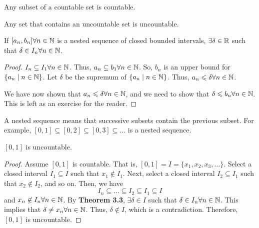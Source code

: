\begin{theorem}{}{}
    Any subset of a countable set is countable.
\end{theorem}
\begin{theorem}{}{}
    Any set that contains an uncountable set is uncountable.
\end{theorem}

\begin{theorem}{}{}
    If $[a_n, b_n] \forall n \in \mathbb{N}$ is a nested sequence of closed bounded intervals, $\exists \delta \in \mathbb{R}$ such that $\delta \in I_n \forall n \in \mathbb{N}$.
\end{theorem}
\begin{proof}
    $I_n \subseteq I_1 \forall n \in \mathbb{N}$. Thus, $a_n \subseteq b_1 \forall n \in \mathbb{N}$. So, $b_n$ is an upper bound for $\{a_n \mid n \in \mathbb{N}\}$. Let $\delta$ be the supremum of $\{a_n \mid n \in \mathbb{N}\}$. Thus, $a_n \leqslant \delta \forall n \in \mathbb{N}$.

    We have now shown that $a_n \leqslant \delta \forall n \in \mathbb{N}$, and we need to show that $\delta \leqslant b_n \forall n \in \mathbb{N}$. This is left as an exercise for the reader.
\end{proof}
\begin{note}
    A nested sequence means that successive subsets contain the previous subset. For example, $[0, 1] \subseteq [0, 2] \subseteq [0, 3] \subseteq \ldots$ is a nested sequence.
\end{note}

\begin{theorem}{}{}
    $[0, 1]$ is uncountable.
\end{theorem}
\begin{proof}
    Assume $[0, 1]$ is countable. That is, $[0, 1] = I = \{x_1, x_2, x_3, \ldots\}$. Select a closed interval $I_1 \subseteq I$ such that $x_1 \not\in I_1$. Next, select a closed interval $I_2 \subseteq I_1$ such that $x_2 \not\in I_2$, and so on. Then, we have $$ I_n \subseteq \ldots \subseteq I_2 \subseteq I_1 \subseteq I $$ and $x_n \not\in I_n \forall n \in \mathbb{N}$. By \textbf{Theorem 3.3}, $\exists \delta \in I$ such that $\delta \in I_n \forall n \in \mathbb{N}$. This implies that $\delta \neq x_n \forall n \in \mathbb{N}$. Thus, $\delta \not\in I$, which is a contradiction. Therefore, $[0, 1]$ is uncountable.
\end{proof}